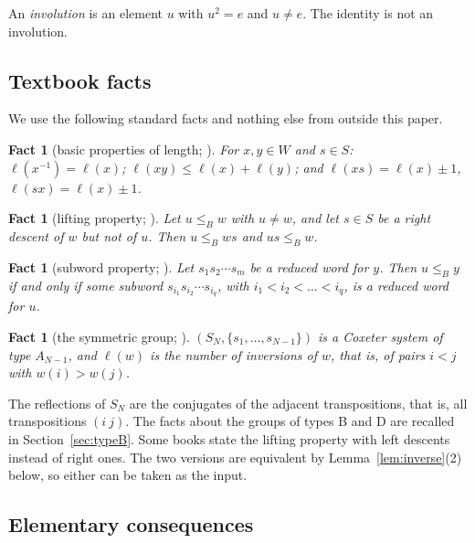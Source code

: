 \documentclass[11pt]{amsart}
\newtheorem{fact}[theorem]{Fact}
\theoremstyle{definition}
\theoremstyle{remark}
\numberwithin{equation}{section}
\newcommand{\leB}{\le_B}
\begin{document}
An \emph{involution} is an element \(u\) with \(u^2=e\) and \(u\neq e\). The identity is not an involution.

\subsection{Textbook facts}\label{sec:facts}
We use the following standard facts and nothing else from outside this paper.

\begin{fact}[basic properties of length; {\cite[Ch.~1]{BB}}]\label{fact:length}
For \(x,y\in W\) and \(s\in S\): \(\ell(x^{-1})=\ell(x)\); \(\ell(xy)\le\ell(x)+\ell(y)\); and \(\ell(xs)=\ell(x)\pm1\), \(\ell(sx)=\ell(x)\pm1\).
\end{fact}

\begin{fact}[lifting property; {\cite[Ch.~2]{BB}}]\label{fact:lifting}
Let \(u\leB w\) with \(u\neq w\), and let \(s\in S\) be a right descent of \(w\) but not of \(u\). Then \(u\leB ws\) and \(us\leB w\).
\end{fact}

\begin{fact}[subword property; {\cite[Ch.~2]{BB}}]\label{fact:subword}
Let \(s_1s_2\cdots s_m\) be a reduced word for \(y\). Then \(u\leB y\) if and only if some subword \(s_{i_1}s_{i_2}\cdots s_{i_q}\), with \(i_1<i_2<\dots<i_q\), is a reduced word for \(u\).
\end{fact}

\begin{fact}[the symmetric group; {\cite[Ch.~1]{BB}}]\label{fact:SN}
\((S_N,\{s_1,\dots,s_{N-1}\})\) is a Coxeter system of type \(A_{N-1}\), and \(\ell(w)\) is the number of inversions of \(w\), that is, of pairs \(i<j\) with \(w(i)>w(j)\).
\end{fact}

The reflections of \(S_N\) are the conjugates of the adjacent transpositions, that is, all transpositions \((i\ j)\). The facts about the groups of types B and D are recalled in Section~\ref{sec:typeB}. Some books state the lifting property with left descents instead of right ones. The two versions are equivalent by Lemma~\ref{lem:inverse}(2) below, so either can be taken as the input.

\subsection{Elementary consequences}
\end{document}
